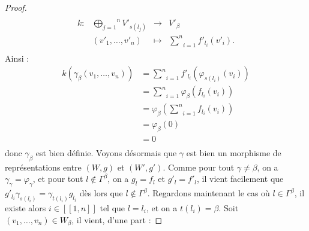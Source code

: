\documentclass[a4paper,10pt]{article}
\begin{document}
\begin{proof}
\[\begin{array}{lccc}
	&&&\\
	k : & \overset{n}{\underset{j=1}{\bigoplus}}V'_{s(l_{j})}&\rightarrow & V'_{\beta} \\ 
	& (v'_{1},\dots,v'_{n})&\mapsto & \underset{i=1}{\overset{n}{\sum}}f'_{l_{i}}(v'_{i}).\\
\end{array}
	\]
Ainsi :
\[
\begin{array}{rl}
	k(\gamma_{\beta}(v_{1},\dots,v_{n})) & = \underset{i=1}{\overset{n}{\sum}}f'_{l_{i}}(\varphi_{s(l_{i})}(v_{i})) \\ 
	& = \underset{i=1}{\overset{n}{\sum}} \varphi_{\beta}(f_{l_{i}}(v_{i}))\\
	& = \varphi_{\beta}(\underset{i=1}{\overset{n}{\sum}}f_{l_{i}}(v_{i}))\\
	& = \varphi_{\beta}(0) \\
	& = 0 \\
\end{array}
\]
donc $\gamma_{\beta}$ est bien définie. Voyons désormais que $\gamma$ est bien un morphisme de représentations entre $(W,g)$ et $(W',g')$. Comme pour tout $\gamma\neq\beta$, on a $\gamma_{\gamma}=\varphi_{\gamma}$, et pour tout $l\notin\Gamma^{\beta}$, on a $g_{l}=f_{l}$ et $g'_{l}=f'_{l}$, il vient facilement que $g'_{l_{i}}\gamma_{s(l_{i})}=\gamma_{t(l_{i})}g_{l_{i}}$ dès lors que $l\notin\Gamma^{\beta}$. Regardons maintenant le cas où $l\in\Gamma^{\beta}$, il existe alors $i\in[\![1,n]\!]$ tel que $l=l_{i}$, et on a $t(l_{i})=\beta$. Soit $(v_{1},\dots,v_{n})\in W_{\beta}$, il vient, d'une part :


\end{proof}
\end{document}
